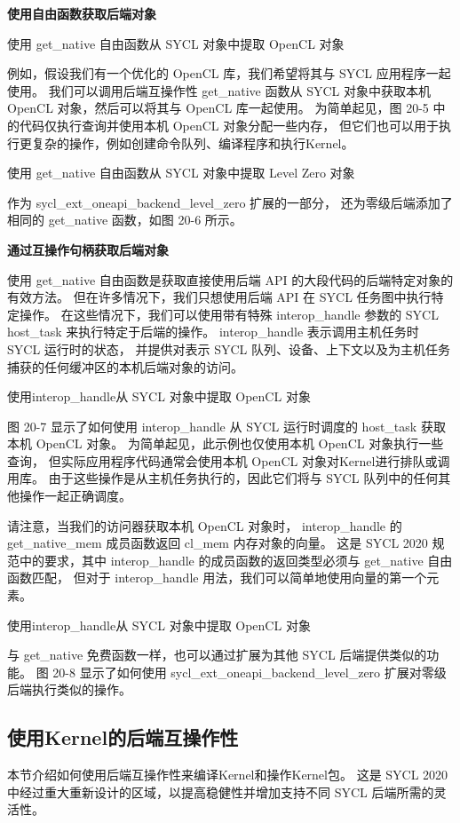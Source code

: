 \textbf{使用自由函数获取后端对象}

{\color{red} 使用 get\_native 自由函数从 SYCL 对象中提取 OpenCL 对象}

例如，假设我们有一个优化的 OpenCL 库，我们希望将其与 SYCL 应用程序一起使用。 
我们可以调用后端互操作性 get\_native 函数从 SYCL 对象中获取本机 OpenCL 对象，然后可以将其与 OpenCL 库一起使用。 
为简单起见，图 20-5 中的代码仅执行查询并使用本机 OpenCL 对象分配一些内存，
但它们也可以用于执行更复杂的操作，例如创建命令队列、编译程序和执行Kernel。

{\color{red} 使用 get\_native 自由函数从 SYCL 对象中提取 Level Zero 对象}

作为 sycl\_ext\_oneapi\_backend\_level\_zero 扩展的一部分，
还为零级后端添加了相同的 get\_native 函数，如图 20-6 所示。

\textbf{通过互操作句柄获取后端对象}

使用 get\_native 自由函数是获取直接使用后端 API 的大段代码的后端特定对象的有效方法。 
但在许多情况下，我们只想使用后端 API 在 SYCL 任务图中执行特定操作。 
在这些情况下，我们可以使用带有特殊 interop\_handle 参数的 SYCL host\_task 来执行特定于后端的操作。 
interop\_handle 表示调用主机任务时 SYCL 运行时的状态，
并提供对表示 SYCL 队列、设备、上下文以及为主机任务捕获的任何缓冲区的本机后端对象的访问。

{\color{red} 使用interop\_handle从 SYCL 对象中提取 OpenCL 对象}

图 20-7 显示了如何使用 interop\_handle 从 SYCL 运行时调度的 host\_task 获取本机 OpenCL 对象。 
为简单起见，此示例也仅使用本机 OpenCL 对象执行一些查询，
但实际应用程序代码通常会使用本机 OpenCL 对象对Kernel进行排队或调用库。 
由于这些操作是从主机任务执行的，因此它们将与 SYCL 队列中的任何其他操作一起正确调度。

请注意，当我们的访问器获取本机 OpenCL 对象时，
interop\_handle 的 get\_native\_mem 成员函数返回 cl\_mem 内存对象的向量。 
这是 SYCL 2020 规范中的要求，其中 interop\_handle 的成员函数的返回类型必须与 get\_native 自由函数匹配，
但对于 interop\_handle 用法，我们可以简单地使用向量的第一个元素。

{\color{red} 使用interop\_handle从 SYCL 对象中提取 OpenCL 对象}

与 get\_native 免费函数一样，也可以通过扩展为其他 SYCL 后端提供类似的功能。 
图 20-8 显示了如何使用 sycl\_ext\_oneapi\_backend\_level\_zero 扩展对零级后端执行类似的操作。

\subsection{使用Kernel的后端互操作性}
本节介绍如何使用后端互操作性来编译Kernel和操作Kernel包。 
这是 SYCL 2020 中经过重大重新设计的区域，以提高稳健性并增加支持不同 SYCL 后端所需的灵活性。

